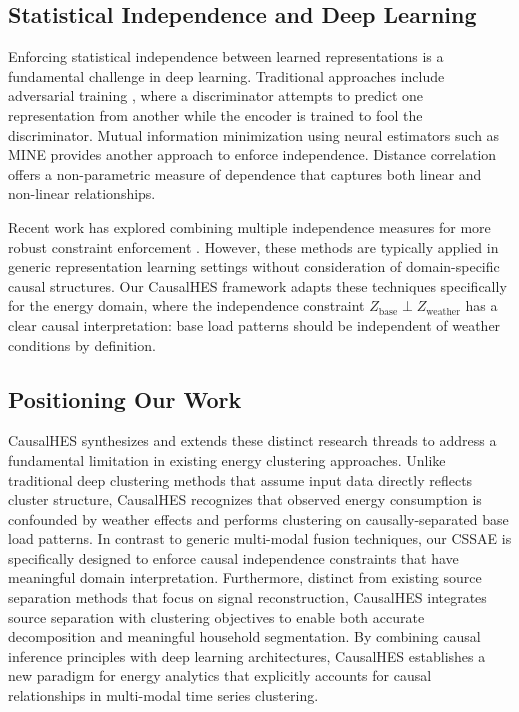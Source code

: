 \documentclass[journal]{IEEEtran}
\begin{document}
\subsection{Statistical Independence and Deep Learning}
Enforcing statistical independence between learned representations is a fundamental challenge in deep learning. Traditional approaches include adversarial training \cite{adversarial_independence}, where a discriminator attempts to predict one representation from another while the encoder is trained to fool the discriminator. Mutual information minimization using neural estimators such as MINE \cite{belghazi2018mine} provides another approach to enforce independence. Distance correlation \cite{szekely2007measuring} offers a non-parametric measure of dependence that captures both linear and non-linear relationships.

Recent work has explored combining multiple independence measures for more robust constraint enforcement \cite{composite_independence_constraints}. However, these methods are typically applied in generic representation learning settings without consideration of domain-specific causal structures. Our CausalHES framework adapts these techniques specifically for the energy domain, where the independence constraint $Z_{\text{base}} \perp Z_{\text{weather}}$ has a clear causal interpretation: base load patterns should be independent of weather conditions by definition.

\subsection{Positioning Our Work}
CausalHES synthesizes and extends these distinct research threads to address a fundamental limitation in existing energy clustering approaches. Unlike traditional deep clustering methods that assume input data directly reflects cluster structure, CausalHES recognizes that observed energy consumption is confounded by weather effects and performs clustering on causally-separated base load patterns. In contrast to generic multi-modal fusion techniques, our CSSAE is specifically designed to enforce causal independence constraints that have meaningful domain interpretation. Furthermore, distinct from existing source separation methods that focus on signal reconstruction, CausalHES integrates source separation with clustering objectives to enable both accurate decomposition and meaningful household segmentation. By combining causal inference principles with deep learning architectures, CausalHES establishes a new paradigm for energy analytics that explicitly accounts for causal relationships in multi-modal time series clustering.
\end{document}
